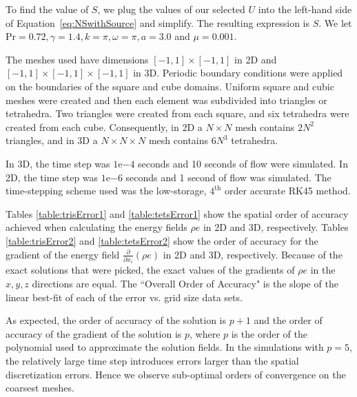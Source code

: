 To find the value of $S$, we plug the values of our selected $U$ into the left-hand side of Equation~\eqref{eq:NSwithSource} and simplify. The resulting expression is $S$. 
We let Pr$=0.72, \gamma = 1.4, k = \pi, \omega = \pi, a = 3.0$ and $\mu = 0.001$.

The meshes used have dimensions $[-1,1] \times [-1,1]$ in 2D and $[-1,1] \times [-1,1] \times [-1,1]$ in 3D. Periodic boundary conditions were applied on the boundaries of the square and cube domains. Uniform square and cubic meshes were created and then each element was subdivided into triangles or tetrahedra. Two triangles were created from each square, and six tetrahedra were created from each cube. Consequently, in 2D a $N \times N$ mesh contains $2N^2$ triangles, and in 3D a $N \times N \times N$ mesh contains $6N^3$ tetrahedra. 


In 3D, the time step was $1$e$-4$ seconds and 10 seconds of flow were simulated. In 2D, the time step was $1$e$-6$ seconds and 1 second of flow was simulated. The time-stepping scheme used was the low-storage, $4^\text{th}$ order accurate RK45 method\cite{carpenter1994fourth}. 







Tables \eqref{table:trisError1} and \eqref{table:tetsError1} show the spatial order of accuracy achieved when calculating the energy fields $\rho e$ in 2D and 3D, respectively. Tables \eqref{table:trisError2} and \eqref{table:tetsError2} show the order of accuracy for the gradient of the energy field $\frac{\partial }{\partial x_i}(\rho e)$ in 2D and 3D, respectively. Because of the exact solutions that were picked, the exact values of the gradients of $\rho e$ in the $x,y,z$ directions are equal. The ``Overall Order of Accuracy" is the slope of the linear best-fit of each of the error vs. grid size data sets.

As expected\cite{hesthaven2007}, the order of accuracy of the solution is $p+1$ and the order of accuracy of the gradient of the solution is $p$, where $p$ is the order of the polynomial used to approximate the solution fields. In the simulations with $p=5$, the relatively large time step introduces errors larger than the spatial discretization errors. Hence we observe sub-optimal orders of convergence on the coarsest meshes.

